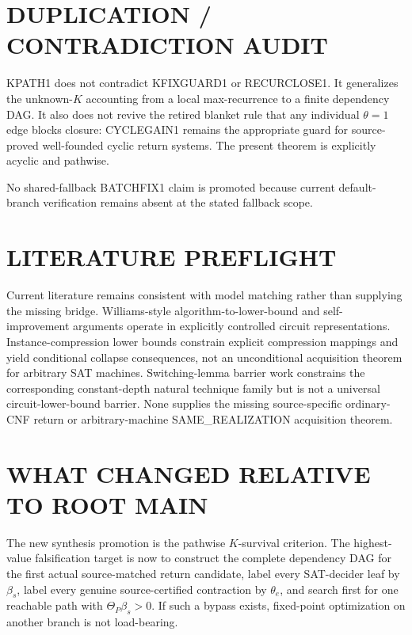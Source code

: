 \documentclass[11pt]{article}
\begin{document}
\section*{DUPLICATION / CONTRADICTION AUDIT}
KPATH1 does not contradict KFIXGUARD1 or RECURCLOSE1. It generalizes the unknown-\(K\) accounting from a local max-recurrence to a finite dependency DAG. It also does not revive the retired blanket rule that any individual \(\theta=1\) edge blocks closure: CYCLEGAIN1 remains the appropriate guard for source-proved well-founded cyclic return systems. The present theorem is explicitly acyclic and pathwise.

No shared-fallback BATCHFIX1 claim is promoted because current default-branch verification remains absent at the stated fallback scope.

\section*{LITERATURE PREFLIGHT}
Current literature remains consistent with model matching rather than supplying the missing bridge. Williams-style algorithm-to-lower-bound and self-improvement arguments operate in explicitly controlled circuit representations. Instance-compression lower bounds constrain explicit compression mappings and yield conditional collapse consequences, not an unconditional acquisition theorem for arbitrary SAT machines. Switching-lemma barrier work constrains the corresponding constant-depth natural technique family but is not a universal circuit-lower-bound barrier. None supplies the missing source-specific ordinary-CNF return or arbitrary-machine SAME\_REALIZATION acquisition theorem.

\section*{WHAT CHANGED RELATIVE TO ROOT MAIN}
The new synthesis promotion is the pathwise \(K\)-survival criterion. The highest-value falsification target is now to construct the complete dependency DAG for the first actual source-matched return candidate, label every SAT-decider leaf by \(\beta_s\), label every genuine source-certified contraction by \(\theta_e\), and search first for one reachable path with \(\Theta_P\beta_s>0\). If such a bypass exists, fixed-point optimization on another branch is not load-bearing.
\end{document}
